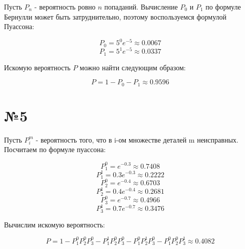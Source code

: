 \documentclass[11pt]{article}
\begin{document}
\begin{sloppypar}
Пусть $P_n$ - вероятность ровно $n$ попаданий. Вычисление $P_0$ и $P_1$ по формуле Бернулли может быть затруднительно, поэтому воспользуемся формулой Пуассона:

\begin{equation}
	P_0 = 5^0 e^{-5} \approx 0.0067
\end{equation}
\begin{equation}
	P_1 = 5^1 e^{-5} \approx 0.0337
\end{equation}

Искомую вероятность $P$ можно найти следующим образом:

\begin{equation}
	P = 1 - P_0 - P_1 \approx 0.9596
\end{equation}

\section*{№5}

Пусть $P_i^m$ - вероятность того, что в i-ом множестве деталей m неисправных. Посчитаем по формуле пуассона:

\begin{equation}
	P_1^0 = e^{-0.3} \approx 0.7408
\end{equation}
\begin{equation}
	P_1^1 = 0.3 e^{-0.3} \approx 0.2222
\end{equation}
\begin{equation}
	P_2^0 = e^{-0.4} \approx 0.6703
\end{equation}
\begin{equation}
	P_2^1 = 0.4 e^{-0.4} \approx 0.2681
\end{equation}
\begin{equation}
	P_3^0 = e^{-0.7} \approx 0.4966
\end{equation}
\begin{equation}
	P_3^1 = 0.7 e^{-0.7} \approx 0.3476
\end{equation}

Вычислим искомую вероятность:

\begin{equation}
	P = 1 - P_1^0 P_2^0 P_3^0 - P_1^1 P_2^0 P_3^0 - P_1^0 P_2^1 P_3^0 - P_1^0 P_2^0 P_3^1 \approx 0.4082
\end{equation} 

\end{sloppypar}
\end{document}
